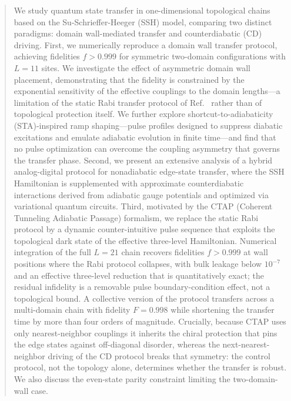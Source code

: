 \documentclass[
  reprint,
  amsmath,
  amssymb,
  aps,
  prb,
  floatfix,
  longbibliography,
]{revtex4-2}
\begin{document}
\author{Supervisors: Gloria Platero \& Yue Ban}

\date{June 2026}

\begin{abstract}
We study quantum state transfer in one-dimensional topological chains based on the
Su-Schrieffer-Heeger (SSH) model, comparing two distinct paradigms:
domain wall-mediated transfer and counterdiabatic (CD) driving.
First, we numerically reproduce a domain wall transfer protocol,
achieving fidelities $f > 0.999$ for symmetric two-domain configurations with
$L = 11$ sites. We investigate the effect of asymmetric domain wall placement,
demonstrating that the fidelity is constrained by the exponential
sensitivity of the effective couplings to the domain lengths---a limitation of
the static Rabi transfer protocol of Ref.~\cite{Zurita2023} rather than of topological protection itself.
We further explore shortcut-to-adiabaticity (STA)-inspired ramp shaping---pulse
profiles designed to suppress diabatic excitations and emulate adiabatic
evolution in finite time---and find that
no pulse optimization can overcome the coupling asymmetry that governs the
transfer phase.
Second, we present an extensive analysis of a hybrid analog-digital protocol
for nonadiabatic edge-state transfer, where the SSH Hamiltonian is supplemented
with approximate counterdiabatic interactions derived from adiabatic gauge
potentials and optimized via variational quantum circuits.
Third, motivated by the CTAP (Coherent Tunneling Adiabatic Passage) formalism,
we replace the static Rabi protocol by a dynamic counter-intuitive pulse sequence
that exploits the topological dark state of the effective three-level
Hamiltonian. Numerical integration of the full $L=21$ chain recovers fidelities
$f>0.999$ at wall positions where the Rabi protocol collapses, with bulk leakage
below $10^{-7}$ and an effective three-level reduction that is quantitatively
exact; the residual infidelity is a removable pulse boundary-condition effect,
not a topological bound. A collective version of the protocol transfers across a
multi-domain chain with fidelity $F=0.998$ while shortening the transfer time by
more than four orders of magnitude. Crucially, because CTAP uses only
nearest-neighbor couplings it inherits the chiral protection that pins the edge
states against off-diagonal disorder, whereas the next-nearest-neighbor driving
of the CD protocol breaks that symmetry: the control protocol, not the topology
alone, determines whether the transfer is robust. We also discuss the even-state
parity constraint limiting the two-domain-wall case.
\end{abstract}
\end{document}
